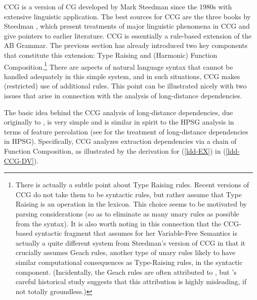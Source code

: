 \documentclass[output=paper
                ,modfonts
 	        ,biblatex
                ,babelshorthands
                ,newtxmath
                ,draftmode
                ,colorlinks, citecolor=brown
]{langscibook}
\begin{document}
CCG is a version of CG developed by Mark Steedman since the 1980s with
extensive linguistic application. The best sources for CCG are the
three books by Steedman \citep{Steedman97a,Steedman2000a-u,steedman2012},
which present treatments of major linguistic phenomena in CCG and
give pointers to earlier literature. CCG is essentially a rule-based
extension of the AB Grammar. The previous
section has already introduced two key components that constitute this extension: Type
Raising and (Harmonic) Function Composition.\footnote{There is
actually a subtle point about Type Raising rules. Recent
versions of CCG \citep[80]{steedman2012} do not take them to be syntactic rules,
but rather assume that Type Raising is an operation in the lexicon.
This choice seems to be motivated by 
parsing considerations (so as to eliminate as  many unary rules as
possible from the syntax). It is also worth noting in this
connection that the CCG-based syntactic fragment that
\citet{Jacobson1999a,Jacobson2000a} assumes for her Variable-Free Semantics
is actually a quite different system from Steedman's version of CCG in
that it crucially assumes Geach rules, another type of unary rules
likely to have similar computational consequences as Type-Raising rules, in the syntactic
component. (Incidentally,  the Geach rules are often attributed
to \citealt{Geach70a},  but \citeauthor{Humberstone2005}'s \citeyear{Humberstone2005} careful
historical study suggests that this attribution is highly misleading, if not
totally groundless.)} There are 
aspects of natural language syntax that cannot 
be handled adequately in this simple system, and in such situations,
CCG makes (restricted) use of additional rules. This point can be
illustrated nicely with two issues that arise in connection with the
analysis of long-distance dependencies.

The basic idea behind the CCG analysis of long-distance dependencies,
due originally to \citet{AS82a}, is very simple and is similar in spirit to
the HPSG analysis in terms of \slasch feature percolation (see
for the treatment of long-distance dependencies in HPSG). Specifically,
CCG analyzes extraction dependencies via a chain of Function
Composition, as illustrated by the derivation for (\ref{ldd-EX}) in (\ref{ldd-CCG-DV}).
\end{document}

